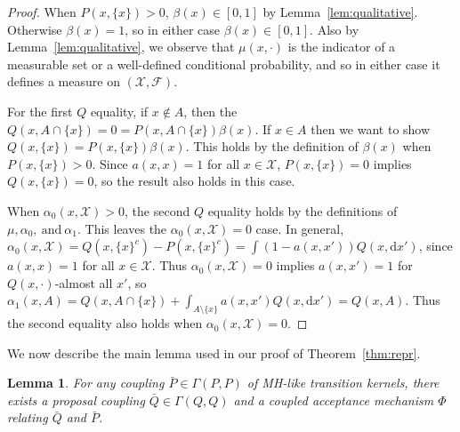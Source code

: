 \documentclass[aihp]{imsart}
\theoremstyle{plain}
\newtheorem{lemma}[theorem]{Lemma}
\theoremstyle{remark}
\theoremstyle{definition} \newtheorem{example}{Example}
\newcommand{\scrF}{\mathscr{F}}
\newcommand{\calX}{\mathcal{X}}
\newcommand{\diff}{\mathrm{d} } %
\newcommand{\sas}{\ \text{and} \ }
\newcommand{\bp}{\bar P}
\newcommand{\bq}{\bar Q}
\newcommand{\sx}{\{ x \}}
\begin{document}
\begin{proof}
When $P(x, \sx) > 0$, $\beta(x) \in [0,1]$ by Lemma~\ref{lem:qualitative}. Otherwise $\beta(x) = 1$,
so in either case $\beta(x) \in [0,1]$. Also by Lemma~\ref{lem:qualitative}, we observe that $\mu(x,
\cdot)$ is the indicator of a measurable set or a well-defined conditional probability, and so in
either case it defines a measure on $(\calX, \scrF)$.

For the first $Q$ equality, if $x \not \in A$, then the $Q(x, A \cap \sx) = 0 = P(x, A \cap \sx)
\beta(x)$. If $x \in A$ then we want to show $Q(x, \sx) = P(x, \sx) \beta(x)$. This holds by the
definition of $\beta(x)$ when $P(x, \sx) > 0$. Since $a(x,x) = 1$ for all $x \in \calX$, $P(x, \sx)
= 0$ implies $Q(x, \sx) = 0$, so the result also holds in this case.

When $\alpha_0(x, \calX) > 0$, the second $Q$ equality holds by the definitions of $\mu, \alpha_0,
\sas \alpha_1$. This leaves the ${\alpha_0(x, \calX)=0}$ case. In general, $\alpha_0(x, \calX) =
Q(x, \sx^c) - P(x, \sx^c) = \int (1 - a(x,x')) Q(x, \diff x')$, since $a(x,x)=1$ for all $x \in
\calX$. Thus $\alpha_0(x, \calX)=0$ implies $a(x,x')=1$ for $Q(x, \cdot)$-almost all $x'$, so
${\alpha_1(x,A)} = {Q(x, A \cap \sx) + \int_{A \setminus \sx} a(x,x') Q(x, \diff x')} = {Q(x, A)}$.
Thus the second equality also holds when $\alpha_0(x, \calX) = 0$.
\end{proof}

We now describe the main lemma used in our proof of Theorem~\ref{thm:repr}.

\smallskip

\begin{lemma} \label{lem:camdpc}
For any coupling $\bp \in \Gamma(P,P)$ of MH-like transition kernels, there exists a proposal
coupling $\bq \in \Gamma(Q,Q)$ and a coupled acceptance mechanism $\Phi$ relating $\bq$ and $\bp$.
\end{lemma}
\end{document}
